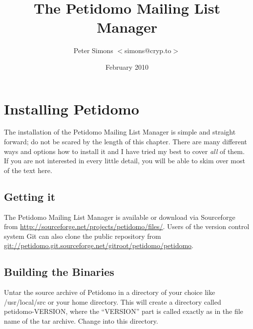 \documentclass[a4paper,11pt]{scrreprt}
\newcommand{\file}[1]{{\textsf{#1}}}
\begin{document}
\title{The Petidomo Mailing List Manager}
\author{Peter Simons $<$simons@cryp.to$>$}
\date{February 2010}
\maketitle
\tableofcontents
\clearpage

\chapter{Installing Petidomo}

The installation of the Petidomo Mailing List Manager is simple and
straight forward; do not be scared by the length of this chapter.
There are many different ways and options how to install it and I have
tried my best to cover \emph{all} of them. If you are not interested
in every little detail, you will be able to skim over most of the text
here.

\section{Getting it}

The Petidomo Mailing List Manager is available or download via
Sourceforge from \url{http://sourceforge.net/projects/petidomo/files/}.
Users of the version control system Git can also clone the public
repository from
\url{git://petidomo.git.sourceforge.net/gitroot/petidomo/petidomo}.

\section{Building the Binaries}

Untar the source archive of Petidomo in a directory of your choice
like \file{/usr/local/src} or your home directory. This will create a
directory called \file{petidomo-VERSION}, where the ``VERSION''
part is called exactly as in the file name of the tar archive. Change
into this directory.
\end{document}

